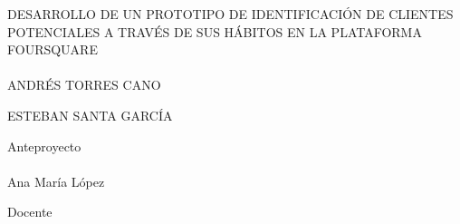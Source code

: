 \documentclass[letterpaper,12pt,oneside,pdftex]{icontec}
\begin{document}
\thispagestyle{empty}

\begin{center}

DESARROLLO DE UN PROTOTIPO DE IDENTIFICACI\'ON DE CLIENTES POTENCIALES A TRAV\'ES DE SUS H\'ABITOS EN LA PLATAFORMA FOURSQUARE\\
\end{center}
\paragraph{}

\paragraph{}

\paragraph{}

\paragraph{}
\begin{center}
ANDR\'ES TORRES CANO
\end{center}
\begin{center}
ESTEBAN SANTA GARC\'IA
\end{center}
\begin{center}
Anteproyecto\\
\end{center}

\paragraph{}
\paragraph{}
\paragraph{}
\begin{center}
Ana Mar\'ia L\'opez
\end{center}
\begin{center}
Docente\\
\end{center}

\paragraph{}
\end{document}
